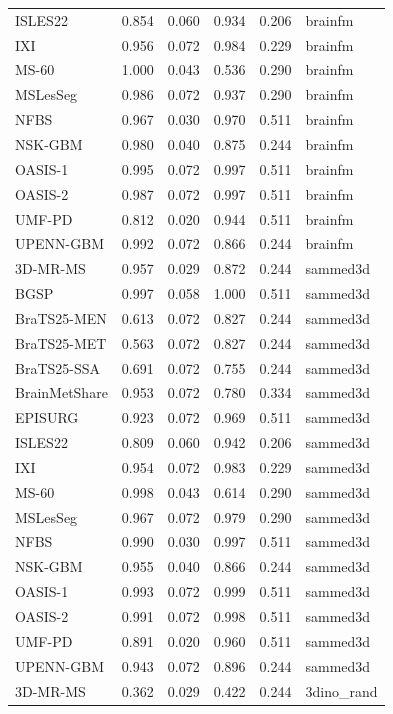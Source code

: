 \begin{tabular}{lrrrrl}
ISLES22 & 0.854 & 0.060 & 0.934 & 0.206 & brainfm \\
IXI & 0.956 & 0.072 & 0.984 & 0.229 & brainfm \\
MS-60 & 1.000 & 0.043 & 0.536 & 0.290 & brainfm \\
MSLesSeg & 0.986 & 0.072 & 0.937 & 0.290 & brainfm \\
NFBS & 0.967 & 0.030 & 0.970 & 0.511 & brainfm \\
NSK-GBM & 0.980 & 0.040 & 0.875 & 0.244 & brainfm \\
OASIS-1 & 0.995 & 0.072 & 0.997 & 0.511 & brainfm \\
OASIS-2 & 0.987 & 0.072 & 0.997 & 0.511 & brainfm \\
UMF-PD & 0.812 & 0.020 & 0.944 & 0.511 & brainfm \\
UPENN-GBM & 0.992 & 0.072 & 0.866 & 0.244 & brainfm \\
3D-MR-MS & 0.957 & 0.029 & 0.872 & 0.244 & sammed3d \\
BGSP & 0.997 & 0.058 & 1.000 & 0.511 & sammed3d \\
BraTS25-MEN & 0.613 & 0.072 & 0.827 & 0.244 & sammed3d \\
BraTS25-MET & 0.563 & 0.072 & 0.827 & 0.244 & sammed3d \\
BraTS25-SSA & 0.691 & 0.072 & 0.755 & 0.244 & sammed3d \\
BrainMetShare & 0.953 & 0.072 & 0.780 & 0.334 & sammed3d \\
EPISURG & 0.923 & 0.072 & 0.969 & 0.511 & sammed3d \\
ISLES22 & 0.809 & 0.060 & 0.942 & 0.206 & sammed3d \\
IXI & 0.954 & 0.072 & 0.983 & 0.229 & sammed3d \\
MS-60 & 0.998 & 0.043 & 0.614 & 0.290 & sammed3d \\
MSLesSeg & 0.967 & 0.072 & 0.979 & 0.290 & sammed3d \\
NFBS & 0.990 & 0.030 & 0.997 & 0.511 & sammed3d \\
NSK-GBM & 0.955 & 0.040 & 0.866 & 0.244 & sammed3d \\
OASIS-1 & 0.993 & 0.072 & 0.999 & 0.511 & sammed3d \\
OASIS-2 & 0.991 & 0.072 & 0.998 & 0.511 & sammed3d \\
UMF-PD & 0.891 & 0.020 & 0.960 & 0.511 & sammed3d \\
UPENN-GBM & 0.943 & 0.072 & 0.896 & 0.244 & sammed3d \\
3D-MR-MS & 0.362 & 0.029 & 0.422 & 0.244 & 3dino\_rand \\

\end{tabular}

